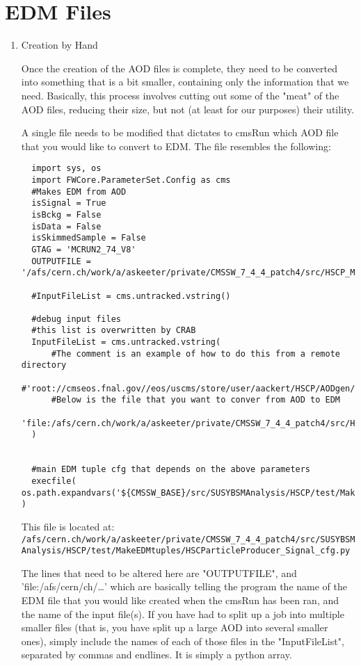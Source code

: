 \documentclass[11 pt , letterpaper , twoside , openright]{book}
\begin{document}
\section{EDM Files}
\label{sec-1-1-3}
\begin{enumerate}
\item Creation by Hand
\label{sec-1-1-3-1}

Once the creation of the AOD files is complete, they need to be
converted into something that is a bit smaller, containing only
the information that we need. Basically, this process involves
cutting out some of the "meat" of the AOD files, reducing their
size, but not (at least for our purposes) their utility.

A single file needs to be modified that dictates to cmsRun which
AOD file that you would like to convert to EDM. The file resembles
the following:

\lstset{language=Python,label= ,caption= ,numbers=none}
\begin{lstlisting}
  import sys, os
  import FWCore.ParameterSet.Config as cms
  #Makes EDM from AOD
  isSignal = True
  isBckg = False
  isData = False
  isSkimmedSample = False
  GTAG = 'MCRUN2_74_V8'
  OUTPUTFILE = '/afs/cern.ch/work/a/askeeter/private/CMSSW_7_4_4_patch4/src/HSCP_MC_Root_Files/mchamp3_M_400_EDM.root'

  #InputFileList = cms.untracked.vstring()

  #debug input files 
  #this list is overwritten by CRAB
  InputFileList = cms.untracked.vstring(
      #The comment is an example of how to do this from a remote directory
      #'root://cmseos.fnal.gov//eos/uscms/store/user/aackert/HSCP/AODgen/condorjdls/step2_condortest.root',
      #Below is the file that you want to conver from AOD to EDM
      'file:/afs/cern.ch/work/a/askeeter/private/CMSSW_7_4_4_patch4/src/HSCP_MC_Root_Files/mchamp3_M_400_AOD.root'
  )


  #main EDM tuple cfg that depends on the above parameters
  execfile( os.path.expandvars('${CMSSW_BASE}/src/SUSYBSMAnalysis/HSCP/test/MakeEDMtuples/HSCParticleProducer_cfg.py') )
\end{lstlisting}

This file is located at:
\texttt{/afs/cern.ch/work/a/askeeter/private/CMSSW\_7\_4\_4\_patch4/src/SUSYBSMAnalysis/HSCP/test/MakeEDMtuples/HSCParticleProducer\_Signal\_cfg.py}

The lines that need to be altered here are "OUTPUTFILE", and
'file:/afs/cern/ch/\ldots{}' which are basically telling the program
the name of the EDM file that you would like created when the
cmsRun has been ran, and the name of the input file(s). If you
have had to split up a job into multiple smaller files (that is,
you have split up a large AOD into several smaller ones), simply
include the names of each of those files in the "InputFileList",
separated by commas and endlines. It is simply a python array.


\end{enumerate}
\end{document}
